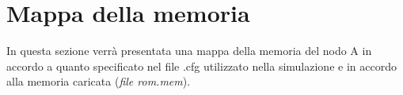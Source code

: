 \documentclass{article}
\begin{document}




\section{Mappa della memoria}
In questa sezione verrà presentata una mappa della memoria del nodo A in accordo a quanto specificato nel file .cfg utilizzato nella simulazione e in accordo alla memoria caricata (\textit{file rom.mem}).
\end{document}
